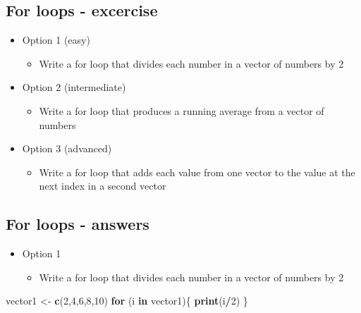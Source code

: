 \documentclass[]{article}
\newenvironment{Shaded}{\begin{snugshade}}{\end{snugshade}}
\newcommand{\KeywordTok}[1]{\textcolor[rgb]{0.13,0.29,0.53}{\textbf{#1}}}
\newcommand{\DecValTok}[1]{\textcolor[rgb]{0.00,0.00,0.81}{#1}}
\newcommand{\StringTok}[1]{\textcolor[rgb]{0.31,0.60,0.02}{#1}}
\newcommand{\ControlFlowTok}[1]{\textcolor[rgb]{0.13,0.29,0.53}{\textbf{#1}}}
\newcommand{\OperatorTok}[1]{\textcolor[rgb]{0.81,0.36,0.00}{\textbf{#1}}}
\newcommand{\NormalTok}[1]{#1}
\providecommand{\tightlist}{%
  \setlength{\itemsep}{0pt}\setlength{\parskip}{0pt}}
\begin{document}
\subsection{For loops - excercise}\label{for-loops---excercise}

\begin{itemize}
\tightlist
\item
  Option 1 (easy)

  \begin{itemize}
  \tightlist
  \item
    Write a for loop that divides each number in a vector of numbers by
    2
  \end{itemize}
\item
  Option 2 (intermediate)

  \begin{itemize}
  \tightlist
  \item
    Write a for loop that produces a running average from a vector of
    numbers
  \end{itemize}
\item
  Option 3 (advanced)

  \begin{itemize}
  \tightlist
  \item
    Write a for loop that adds each value from one vector to the value
    at the next index in a second vector
  \end{itemize}
\end{itemize}

\subsection{For loops - answers}\label{for-loops---answers}

\begin{itemize}
\tightlist
\item
  Option 1

  \begin{itemize}
  \tightlist
  \item
    Write a for loop that divides each number in a vector of numbers by
    2
  \end{itemize}
\end{itemize}

\begin{Shaded}
\begin{Highlighting}[]
\NormalTok{vector1 <-}\StringTok{ }\KeywordTok{c}\NormalTok{(}\DecValTok{2}\NormalTok{,}\DecValTok{4}\NormalTok{,}\DecValTok{6}\NormalTok{,}\DecValTok{8}\NormalTok{,}\DecValTok{10}\NormalTok{)}
\ControlFlowTok{for}\NormalTok{ (i }\ControlFlowTok{in}\NormalTok{ vector1)\{}
  \KeywordTok{print}\NormalTok{(i}\OperatorTok{/}\DecValTok{2}\NormalTok{)}
\NormalTok{\}}
\end{Highlighting}
\end{Shaded}
\end{document}
